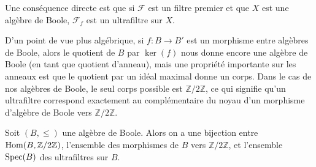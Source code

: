 Une conséquence directe est que si $\mathcal F$ est un filtre premier et que $X$
est une algèbre de Boole, $\mathcal F_f$ est un ultrafiltre sur $X$.

D'un point de vue plus algébrique, si $f : B \to B'$ est un morphisme entre
algèbres de Boole, alors le quotient de $B$ par $\ker(f)$ nous donne encore une
algèbre de Boole (en tant que quotient d'anneau), mais une propriété importante
sur les anneaux est que le quotient par un idéal maximal donne un corps. Dans le
cas de nos algèbres de Boole, le seul corps possible est $\mathbb Z/2\mathbb Z$,
ce qui signifie qu'un ultrafiltre correspond exactement au complémentaire du
noyau d'un morphisme d'algèbre de Boole vers $\mathbb Z/2\mathbb Z$.

\begin{proposition}
  Soit $(B,\leq)$ une algèbre de Boole. Alors on a une bijection entre
  $\operatorname{Hom}(B,\mathbb Z/2\mathbb Z)$, l'ensemble des morphismes de $B$ vers
  $\mathbb Z/2\mathbb Z$, et l'ensemble $\operatorname{Spec}(B)$ des ultrafiltres sur $B$.
\end{proposition}

